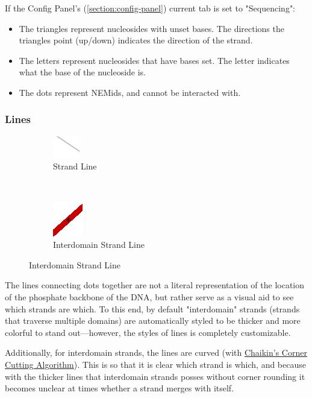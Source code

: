 \documentclass[titlepage]{article}
\begin{document}
	If the Config Panel's (\ref{section:config-panel}) current tab is set to "Sequencing":
	\begin{itemize}
		\item The triangles represent nucleosides with unset bases. The directions the triangles point (up/down) indicates the direction of the strand.
		\item The letters represent nucleosides that have bases set. The letter indicates what the base of the nucleoside is. 
		\item The dots represent NEMids, and cannot be interacted with.
	\end{itemize}

	\subsubsection{Lines}

	\begin{figure}[h]
		\centering
		\caption{Side View Plot Line Graphics}
		\label{fig:side-view-plot-line-graphics}
		
		\begin{subfigure}{.4\linewidth}
			\centering
			\includegraphics[width=.3in]{strand-line.png}
			\caption{Strand Line}
			\label{fig:strand-line}
		\end{subfigure}%
		~
		\begin{subfigure}{.3\linewidth}
			\centering
			\includegraphics[width=.3in]{interdomain-strand-line.png}
			\caption{Interdomain Strand Line}
			\label{fig:interdomain-strand-line}
		\end{subfigure}
	\end{figure}

	The lines connecting dots together are not a literal representation of the location of the phosphate backbone of the DNA, but rather serve as a visual aid to see which strands are which. To this end, by default "interdomain" strands (strands that traverse multiple domains) are automatically styled to be thicker and more colorful to stand out—however, the styles of lines is completely customizable.
	
	Additionally, for interdomain strands, the lines are curved (with \href{https://www.cs.unc.edu/~dm/UNC/COMP258/LECTURES/Chaikins-Algorithm.pdf}{Chaikin's Corner Cutting Algorithm}). This is so that it is clear which strand is which, and because with the thicker lines that interdomain strands posses without corner rounding it becomes unclear at times whether a strand merges with itself. 
	
\end{document}
